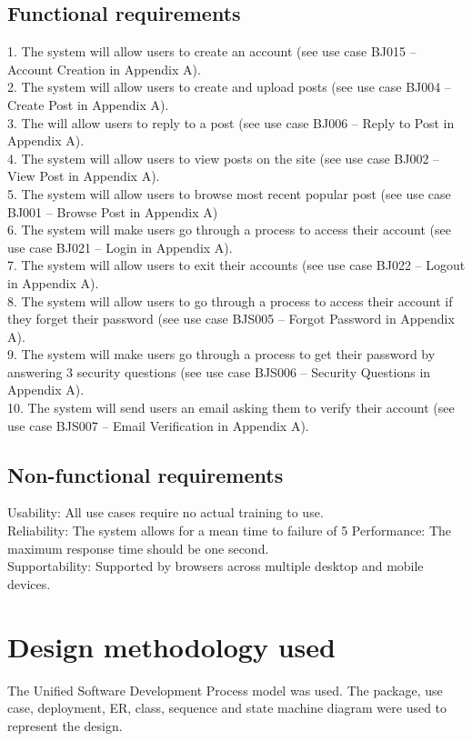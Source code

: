 \documentclass{report}
\begin{document}
	\subsection{Functional requirements}
	1.	The system will allow users to create an account (see use case BJ015 – Account Creation in Appendix A).\\
	2.	The system will allow users to create and upload posts (see use case BJ004 – Create Post in Appendix A).\\
	3.	The will allow users to reply to a post (see use case BJ006 – Reply to Post in Appendix A).\\
	4.	The system will allow users to view posts on the site (see use case BJ002 – View Post in Appendix A).\\
	5.	The system will allow users to browse most recent popular post (see use case BJ001 – Browse Post in Appendix A)\\
	6.	The system will make users go through a process to access their account (see use case BJ021 – Login in Appendix A).\\
	7.	The system will allow users to exit their accounts (see use case BJ022 – Logout in Appendix A).\\
	8.	The system will allow users to go through a process to access their account if they forget their password (see use case BJS005 – Forgot Password in Appendix A).\\
	9.	The system will make users go through a process to get their password by answering 3 security questions (see use case BJS006 – Security Questions in Appendix A).\\
	10.	The system will send users an email asking them to verify their account (see use case BJS007 – Email Verification in Appendix A).\\
	\subsection{Non-functional requirements}
	Usability: All use cases require no actual training to use.\\
	Reliability: The system allows for a mean time to failure of 5%
	Performance: The maximum response time should be one second.\\
	Supportability: Supported by browsers across multiple desktop and mobile devices.\\
\section{Design methodology used} 
	The Unified Software Development Process model was used. The package, use case, deployment, ER, class, sequence and state machine diagram were used to represent the design.
\end{document}
